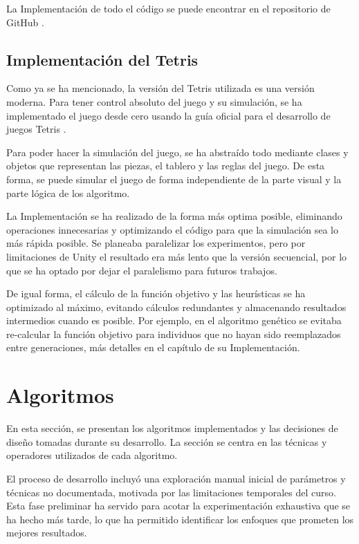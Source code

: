 \documentclass[11pt,spanish,listoffigures,listoftables]{tfgetsinf}
\begin{document}
La Implementación de todo el código se puede encontrar en el repositorio de GitHub \cite{}.

\section{Implementación del Tetris}
Como ya se ha mencionado, la versión del Tetris utilizada es una versión moderna. Para tener control absoluto del juego y su simulación, se ha implementado el juego desde cero usando la guía oficial para el desarrollo de juegos Tetris \cite{}.

Para poder hacer la simulación del juego, se ha abstraído todo mediante clases y objetos que representan las piezas, el tablero y las reglas del juego. De esta forma, se puede simular el juego de forma independiente de la parte visual y la parte lógica de los algoritmo. 

La Implementación se ha realizado de la forma más optima posible, eliminando operaciones innecesarias y optimizando el código para que la simulación sea lo más rápida posible. Se planeaba paralelizar los experimentos, pero por limitaciones de Unity el resultado era más lento que la versión secuencial, por lo que se ha optado por dejar el paralelismo para futuros trabajos.

De igual forma, el cálculo de la función objetivo y las heurísticas se ha optimizado al máximo, evitando cálculos redundantes y almacenando resultados intermedios cuando es posible. Por ejemplo, en el algoritmo genético se evitaba re-calcular la función objetivo para individuos que no hayan sido reemplazados entre generaciones, más detalles en el capítulo de su Implementación.


\chapter{Algoritmos}
En esta sección, se presentan los algoritmos implementados y las decisiones de diseño tomadas durante su desarrollo. La sección se centra en las técnicas y operadores utilizados de cada algoritmo.

El proceso de desarrollo incluyó una exploración manual inicial de parámetros y técnicas no documentada, motivada por las limitaciones temporales del curso. Esta fase preliminar ha servido para acotar la experimentación exhaustiva que se ha hecho más tarde, lo que ha permitido identificar los enfoques que prometen los mejores resultados.
\end{document}
